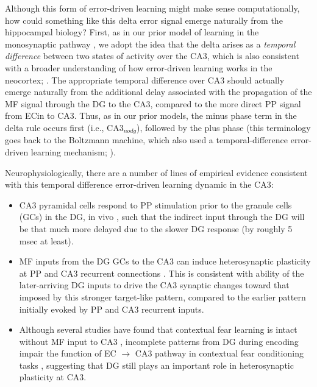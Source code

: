 \documentclass[11pt,twoside]{article}
\newif\myifpdf
\begin{document}
Although this form of error-driven learning might make sense computationally, how could something like this delta error signal emerge naturally from the hippocampal biology?  First, as in our prior model of learning in the monosynaptic pathway \citep{KetzMorkondaOReilly13}, we adopt the idea that the delta arises as a \emph{temporal difference} between two states of activity over the CA3, which is also consistent with a broader understanding of how error-driven learning works in the neocortex; \citep{OReilly96,OReillyMunakata00,OReillyRussinZolfagharEtAl21}. The appropriate temporal difference over CA3 should actually emerge naturally from the additional delay associated with the propagation of the MF signal through the DG to the CA3, compared to the more direct PP signal from ECin to CA3.  Thus, as in our prior models, the minus phase term in the delta rule occurs first (i.e., $\mbox{CA3}_{nodg}$), followed by the plus phase (this terminology goes back to the Boltzmann machine, which also used a temporal-difference error-driven learning mechanism; \citealp{AckleyHintonSejnowski85}).

Neurophysiologically, there are a number of lines of empirical evidence consistent with this temporal difference error-driven learning dynamic in the CA3:
\begin{itemize}

	\item CA3 pyramidal cells respond to PP stimulation prior to the granule cells (GCs) in the DG, in vivo \citep{YeckelBerger90,DoMartinezMartinezEtAl02}, such that the indirect input through the DG will be that much more delayed due to the slower DG response (by roughly 5 msec at least).

    \item MF inputs from the DG GCs to the CA3 can induce heterosynaptic plasticity at PP and CA3 recurrent connections \citep{McMahonBarrionuevo02,TsukamotoYasuiYamadaEtAl03,KobayashiPoo04,RebolaCartaMulle17}. This is consistent with ability of the later-arriving DG inputs to drive the CA3 synaptic changes toward that imposed by this stronger target-like pattern, compared to the earlier pattern initially evoked by PP and CA3 recurrent inputs.

    \item Although several studies have found that contextual fear learning is intact without MF input to CA3 \citep{McHughJonesQuinnEtAl07,NakashibaCushmanPelkeyEtAl12,KitamuraSunMartinEtAl15}, incomplete patterns from DG during encoding impair the function of EC $\rightarrow$ CA3 pathway in contextual fear conditioning tasks \citep{BernierLacagninaAyoubEtAl17}, suggesting that DG still plays an important role in heterosynaptic plasticity at CA3.
\end{itemize}
\end{document}
